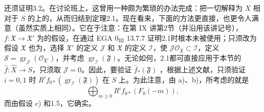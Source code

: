 还须证明3.2。在讨论班上，这曾用一种颇为繁琐的办法完成：把一切解释为 $X$ 相对于 $S$ 的上的，从而归结到定理2.1。现在看来，下面的方法更直接，也更令人满意（虽然实质上相同）。它在于注意：在第 IX 讲第2节（并沿用该讲记号）， $f:\mathfrak X\to\mathfrak X'$ 为的假设，在通过 EGA $0_{\mathrm{III}}$ 13.7.7 证明2.1时根本未被使用；只须改为假设 $\mathfrak X$ 也为，选择 $\mathfrak X'$ 的定义 $\mathcal J$ 和 $\mathfrak X$ 的定义 $\mathcal I$，使 $\mathcal J\mathcal O_{\mathfrak X}\subset\mathcal I$，定义 $\mathscr S=\operatorname{gr}_{\mathcal J}(\mathcal O_{\mathfrak X'})$，并考虑 $\operatorname{gr}_{\mathcal I}(\mathfrak F)$。无论如何，2.1都可直接应用于本节的 $\widehat f:\widehat X\to S$，只须取 $\mathcal J=0$。因此，要验证 $\widehat f_*(\mathfrak F)$ ，根据上述文献，只须验证 $i=0,1$ 时 $R^if_{0*}(\operatorname{gr}_{\mathcal I}(\mathfrak F))$ 在 $S$ 上。为此注意，由 a)、b)，所考虑的就是
\[
 \bigoplus_{m\geq0}R^if_{0*}(F_0(-m)),
\]
而由假设 c) 和1.5，它确实。

